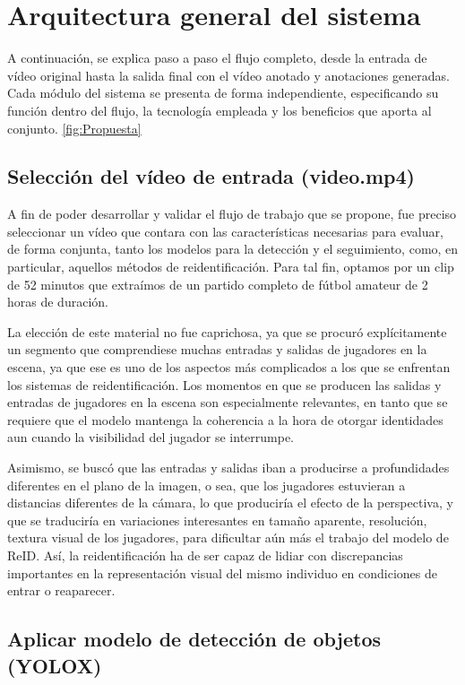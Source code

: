 \documentclass[12pt, a4paper, twoside]{article}
\begin{document}
	
	\section{Arquitectura general del sistema}
	
	A continuación, se explica paso a paso el flujo completo, desde la entrada de vídeo original hasta la salida final con el vídeo anotado y anotaciones generadas. Cada módulo del sistema se presenta de forma independiente, especificando su función dentro del flujo, la tecnología empleada y los beneficios que aporta al conjunto. \ref{fig:Propuesta}
	
	\subsection{Selección del vídeo de entrada (video.mp4)}
	
	A fin de poder desarrollar y validar el flujo de trabajo que se propone, fue preciso seleccionar un vídeo que contara con las características necesarias para evaluar, de forma conjunta, tanto los modelos para la detección y el seguimiento, como, en particular, aquellos métodos de reidentificación. Para tal fin, optamos por un clip de 52 minutos que extraímos de un partido completo de fútbol amateur de 2 horas de duración.
	
	La elección de este material no fue caprichosa, ya que se procuró explícitamente un segmento que comprendiese muchas entradas y salidas de jugadores en la escena, ya que ese es uno de los aspectos más complicados a los que se enfrentan los sistemas de reidentificación. Los momentos en que se producen las salidas y entradas de jugadores en la escena son especialmente relevantes, en tanto que se requiere que el modelo mantenga la coherencia a la hora de otorgar identidades aun cuando la visibilidad del jugador se interrumpe.
	
	Asimismo, se buscó que las entradas y salidas iban a producirse a profundidades diferentes en el plano de la imagen, o sea, que los jugadores estuvieran a distancias diferentes de la cámara, lo que produciría el efecto de la perspectiva, y que se traduciría en variaciones interesantes en tamaño aparente, resolución, textura visual de los jugadores, para dificultar aún más el trabajo del modelo de ReID. Así, la reidentificación ha de ser capaz de lidiar con discrepancias importantes en la representación visual del mismo individuo en condiciones de entrar o reaparecer.
	
	\subsection{Aplicar modelo de detección de objetos (YOLOX)}
	
\end{document}
